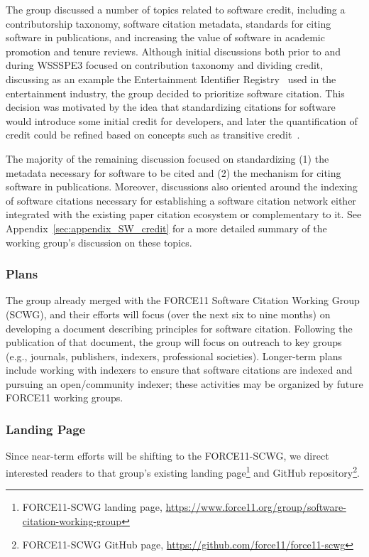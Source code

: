 The group discussed a number of topics related to software credit, including a
contributorship taxonomy, software citation metadata, standards for citing
software in publications, and increasing the value of software in academic
promotion and tenure reviews. Although initial discussions both prior to and
during WSSSPE3 focused on contribution taxonomy and dividing credit, discussing
as an example the Entertainment Identifier Registry~\cite{EIDR} used in the
entertainment industry, the group decided to prioritize software citation. This
decision was motivated by the idea that standardizing citations for software
would introduce some initial credit for developers, and later the quantification
of credit could be refined based on concepts such as transitive
credit~\cite{wssspe2_katz,Katz:2014_tc}.

The majority of the remaining discussion focused on standardizing (1) the
metadata necessary for software to be cited and (2) the mechanism for citing
software in publications. Moreover, discussions also oriented around the
indexing of software citations necessary for establishing a software citation
network either integrated with the existing paper citation ecosystem or
complementary to it. See Appendix~\ref{sec:appendix_SW_credit} for a more
detailed summary of the working group's discussion on these topics.

\subsubsection{Plans}

The group already merged with the FORCE11 Software Citation Working Group
(SCWG), and their efforts will focus (over the next six to nine months) on
developing a document describing principles for software citation. Following the
publication of that document, the group will focus on outreach to key
groups (e.g., journals, publishers, indexers, professional societies).
Longer-term plans include working with indexers to ensure that software
citations are indexed and pursuing an open\slash community indexer; these
activities may be organized by future FORCE11 working groups.

\subsubsection{Landing Page}

Since near-term efforts will be shifting to the FORCE11-SCWG, we direct
interested readers to that group's existing landing page\footnote{FORCE11-SCWG
landing page,
\url{https://www.force11.org/group/software-citation-working-group}} and GitHub
repository\footnote{FORCE11-SCWG GitHub page,
\url{https://github.com/force11/force11-scwg}}.
